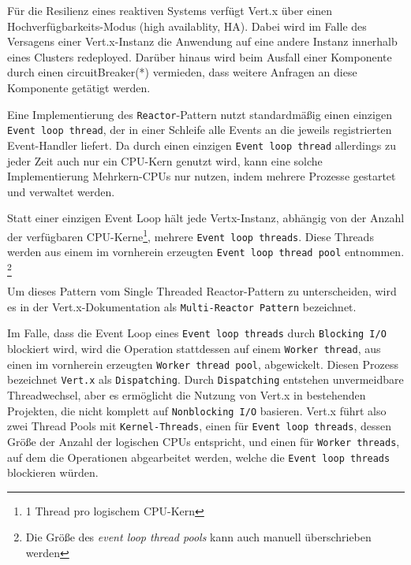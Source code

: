 Für die Resilienz eines reaktiven Systems verfügt Vert.x über einen Hochverfügbarkeits-Modus (high availablity, HA).
Dabei wird im Falle des Versagens einer Vert.x-Instanz die Anwendung auf eine andere Instanz innerhalb eines Clusters redeployed.
Darüber hinaus wird beim Ausfall einer Komponente durch einen \Gls{circuitBreaker}(*) vermieden, dass weitere Anfragen an diese
Komponente getätigt werden.\newline

Eine Implementierung des \verb|Reactor|-Pattern nutzt standardmäßig einen einzigen \newline\verb|Event loop thread|,
der in einer Schleife alle Events an die jeweils registrierten Event-Handler liefert.
Da durch einen einzigen \verb|Event loop thread| allerdings zu jeder Zeit auch nur ein CPU-Kern genutzt wird, kann
eine solche Implementierung Mehrkern-CPUs nur nutzen, indem mehrere Prozesse gestartet und verwaltet werden.

Statt einer einzigen Event Loop hält jede Vertx-Instanz, abhängig von der Anzahl der verfügbaren CPU-Kerne\footnote{1 Thread pro logischem CPU-Kern},
mehrere \verb|Event loop threads|. Diese Threads werden aus einem im vornherein erzeugten \verb|Event loop thread pool| entnommen.
\footnote{Die Größe des \textit{event loop thread pools} kann auch manuell überschrieben werden}

Um dieses Pattern vom Single Threaded Reactor-Pattern zu unterscheiden, wird es in der Vert.x-Dokumentation als \verb|Multi-Reactor Pattern| bezeichnet.
\parencite{Vert.xDocs}  \newline

Im Falle, dass die Event Loop eines \verb|Event loop threads| durch \verb|Blocking I/O| blockiert wird, wird die Operation stattdessen auf einem
\verb|Worker thread|, aus einen im vornherein erzeugten \verb|Worker thread pool|, abgewickelt. Diesen Prozess bezeichnet \verb|Vert.x| als \verb|Dispatching|.
Durch \verb|Dispatching| entstehen unvermeidbare Threadwechsel, aber es ermöglicht die Nutzung von Vert.x in bestehenden Projekten, die nicht komplett
auf \verb|Nonblocking I/O| basieren\parencite[Seite 2]{VertxArticle}.
Vert.x führt also zwei Thread Pools mit \verb|Kernel-Threads|, einen für \verb|Event loop threads|, dessen Größe der Anzahl der logischen CPUs entspricht,
und einen für \verb|Worker threads|, auf dem die Operationen abgearbeitet werden, welche die \verb|Event loop threads| blockieren würden.
\parencite{Vert.xOptions}

